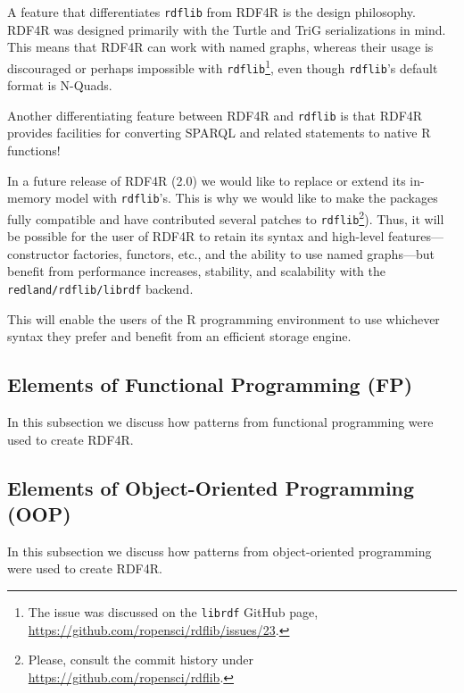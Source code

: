 A feature that differentiates {\tt rdflib} from RDF4R is the design philosophy. RDF4R was designed primarily with the Turtle and TriG serializations in mind. This means that RDF4R can work with named graphs, whereas their usage is discouraged or perhaps impossible with {\tt rdflib}\footnote{The issue was discussed on the {\tt librdf} GitHub page, \url{https://github.com/ropensci/rdflib/issues/23}.}, even though {\tt rdflib}'s default format is N-Quads.

Another differentiating feature between RDF4R and {\tt rdflib} is that RDF4R provides facilities for converting SPARQL and related statements to native R functions!

In a future release of RDF4R (2.0) we would like to replace or extend its in-memory model with {\tt rdflib}'s. This is why we would like to make the packages fully compatible and have contributed several patches to {\tt rdflib}\footnote{Please, consult the commit history under \url{https://github.com/ropensci/rdflib}.}). Thus, it will be possible for the user of RDF4R to retain its syntax and high-level features--- constructor factories, functors, etc., and the ability to use named graphs---but benefit from performance increases, stability, and scalability with the {\tt redland/rdflib/librdf} backend.

This will enable the users of the R programming environment to use whichever syntax they prefer and benefit from an efficient storage engine.

\subsection{Elements of Functional Programming (FP)}

In this subsection we discuss how patterns from functional programming were used to create RDF4R.

\subsection{Elements of Object-Oriented Programming (OOP)}

In this subsection we discuss how patterns from object-oriented programming were used to create RDF4R.
